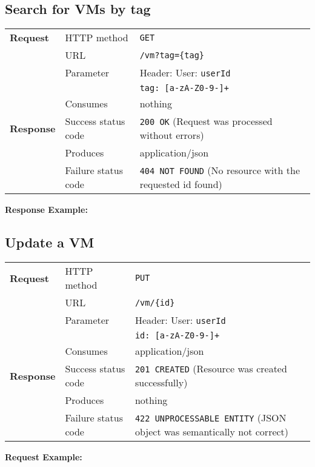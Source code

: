 \subsection{Search for VMs by tag} %

\begin{center}
	\begin{tabularx}{\textwidth}{llX} 
	    \toprule
					\textbf{Request}        &   HTTP method             &   \texttt{GET}			\tabularnewline
		                        			&   URL                     &   \texttt{/vm?tag=\{tag\}}           	\tabularnewline
									& Parameter & Header: User: \texttt{userId} \tabularnewline
													& & \texttt{tag: [a-zA-Z0-9-]+} \tabularnewline
                                  &   Consumes                &   nothing					      	\tabularnewline \midrule                       
          \textbf{Response}       &   Success status code     &   \texttt{200 OK} (Request was processed without errors) 	\tabularnewline
                                  &   Produces                &   application/json								\tabularnewline
                                  &   Failure status code     &   \texttt{404 NOT FOUND} (No resource with the requested id found)	\tabularnewline
           \bottomrule
	\end{tabularx}
\end{center}
\pagebreak[3] 	
\pagebreak[3]
		\textbf{Response Example:}
		


\subsection{Update a VM} %

\begin{center}
	\begin{tabularx}{\textwidth}{llX} 
	    \toprule
					\textbf{Request}        &   HTTP method             &   \texttt{PUT}			\tabularnewline
		                        			&   URL                     &   \texttt{/vm/\{id\}}           	\tabularnewline
									& Parameter & Header: User: \texttt{userId} \tabularnewline
													& & \texttt{id: [a-zA-Z0-9-]+} \tabularnewline
                                  &   Consumes                &   application/json					      	\tabularnewline \midrule                       
          \textbf{Response}       &   Success status code     &   \texttt{201 CREATED} (Resource was created successfully) 	\tabularnewline
                                  &   Produces                &   nothing								\tabularnewline
                                  &   Failure status code     &   \texttt{422 UNPROCESSABLE ENTITY} (JSON object was semantically not correct)	\tabularnewline
           \bottomrule
	\end{tabularx}
\end{center}
\pagebreak[3] 	
		\textbf{Request Example:}
		
\pagebreak[3]


